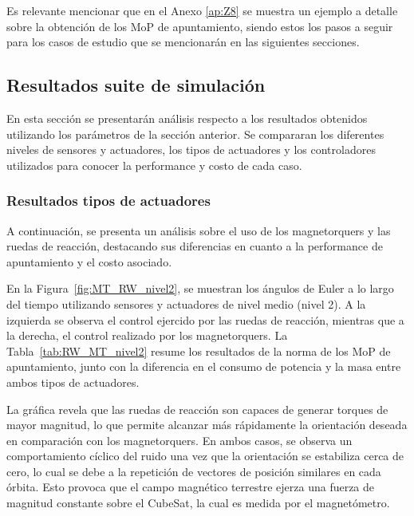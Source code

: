 Es relevante mencionar que en el Anexo \ref{ap:Z8} se muestra un ejemplo a detalle sobre la obtención de los MoP de apuntamiento, siendo estos los pasos a seguir para los casos de estudio que se mencionarán en las siguientes secciones.

\subsection{Resultados suite de simulación}

En esta sección se presentarán análisis respecto a los resultados obtenidos utilizando los parámetros de la sección anterior. Se compararan los diferentes niveles de sensores y actuadores, los tipos de actuadores y los controladores utilizados para conocer la performance y costo de cada caso.

\subsubsection{Resultados tipos de actuadores}

A continuación, se presenta un análisis sobre el uso de los magnetorquers y las ruedas de reacción, destacando sus diferencias en cuanto a la performance de apuntamiento y el costo asociado.

En la Figura~\ref{fig:MT_RW_nivel2}, se muestran los ángulos de Euler a lo largo del tiempo utilizando sensores y actuadores de nivel medio (nivel 2). A la izquierda se observa el control ejercido por las ruedas de reacción, mientras que a la derecha, el control realizado por los magnetorquers. La Tabla~\ref{tab:RW_MT_nivel2} resume los resultados de la norma de los MoP de apuntamiento, junto con la diferencia en el consumo de potencia y la masa entre ambos tipos de actuadores.

La gráfica revela que las ruedas de reacción son capaces de generar torques de mayor magnitud, lo que permite alcanzar más rápidamente la orientación deseada en comparación con los magnetorquers. En ambos casos, se observa un comportamiento cíclico del ruido una vez que la orientación se estabiliza cerca de cero, lo cual se debe a la repetición de vectores de posición similares en cada órbita. Esto provoca que el campo magnético terrestre ejerza una fuerza de magnitud constante sobre el CubeSat, la cual es medida por el magnetómetro.

